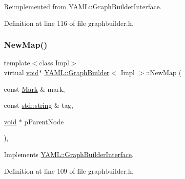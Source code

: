 Reimplemented from \mbox{\hyperlink{class_y_a_m_l_1_1_graph_builder_interface_ae572063ef5c737705e2f75340b116766}{Y\+A\+M\+L\+::\+Graph\+Builder\+Interface}}.



Definition at line 116 of file graphbuilder.\+h.

\mbox{\label{class_y_a_m_l_1_1_graph_builder_a068a87f424528fb7ff77f998d073a92c}} 
\subsubsection{\texorpdfstring{NewMap()}{NewMap()}}
{\footnotesize\ttfamily template$<$class Impl$>$ \\
virtual \mbox{\hyperlink{glad_8h_a950fc91edb4504f62f1c577bf4727c29}{void}}$\ast$ \mbox{\hyperlink{class_y_a_m_l_1_1_graph_builder}{Y\+A\+M\+L\+::\+Graph\+Builder}}$<$ Impl $>$\+::New\+Map (\begin{DoxyParamCaption}\item[{const \mbox{\hyperlink{struct_y_a_m_l_1_1_mark}{Mark}} \&}]{mark,  }\item[{const \mbox{\hyperlink{glad_8h_ac83513893df92266f79a515488701770}{std\+::string}} \&}]{tag,  }\item[{\mbox{\hyperlink{glad_8h_a950fc91edb4504f62f1c577bf4727c29}{void}} $\ast$}]{p\+Parent\+Node }\end{DoxyParamCaption})\hspace{0.3cm}{\ttfamily [inline]}, {\ttfamily [virtual]}}



Implements \mbox{\hyperlink{class_y_a_m_l_1_1_graph_builder_interface_ac90052647ba4db8536e3e457d7bb7489}{Y\+A\+M\+L\+::\+Graph\+Builder\+Interface}}.



Definition at line 109 of file graphbuilder.\+h.

\mbox{\label{class_y_a_m_l_1_1_graph_builder_a87d59ffe96e3101f96e0791aacba0f0b}} 
